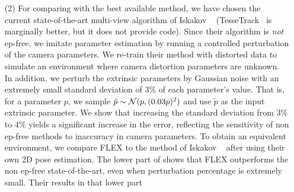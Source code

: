 \begin{enumerate}[nosep,leftmargin=0cm,itemindent=0.5cm,labelwidth=\itemindent,labelsep=0cm,align=left]
\item[(2)] 
For comparing with the best available method, 
we have chosen the current state-of-the-art multi-view algorithm of Iskakov \etal~\cite{iskakov2019learnable} (TesseTrack~\cite{Reddy2021TesseTrackEL} is marginally better, but it does not provide code). Since their algorithm is \emph{not} ep-free, we
imitate parameter estimation by running a controlled perturbation of the camera parameters.
We re-train their method with distorted data to simulate an environment where camera distortion parameters are unknown. 
In addition, we perturb the 
extrinsic parameters by Gaussian noise with an extremely small standard deviation of 3\% of each parameter's 
value. That is, for a parameter $p$, we sample $\tilde{p}\sim\mathcal{N}(p,(0.03 p)^2)$ and use $\tilde{p}$ as the input extrinsic parameter. 
We show that increasing the standard deviation from 3\% to 4\% yields a significant increase in the error, reflecting the sensitivity of non ep-free methods to  inaccuracy in camera parameters.
To obtain an equivalent environment, we compare FLEX to the method of Iskakov \etal~ after using their own 2D pose estimation.
The lower part of  shows that FLEX outperforms the non ep-free state-of-the-art, even when perturbation percentage is extremely small.
Their results
in that lower part 

\end{enumerate}
